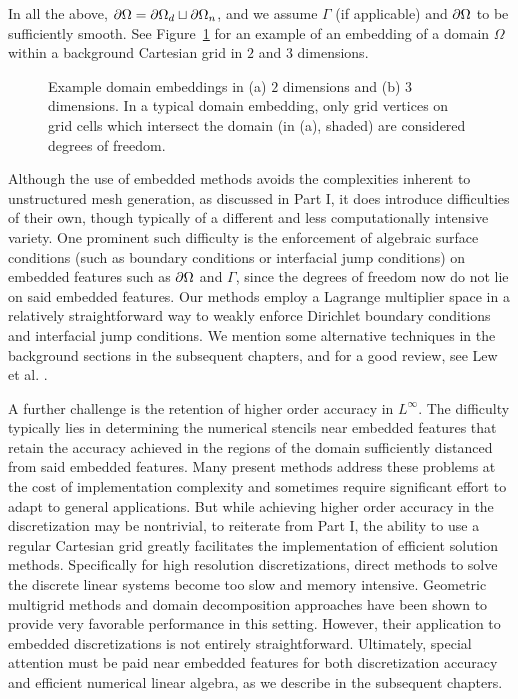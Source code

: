 In all the above, $\partial\Omega = \partial\Omega_d \sqcup \partial\Omega_n$, and we assume $\Gamma$ (if applicable) and $\partial\Omega$ to be sufficiently smooth. See Figure~\ref{fig:pt2.embedding} for an example of an embedding of a domain $\Omega$ within a background Cartesian grid in $2$ and $3$ dimensions.

\setlength{\figureheight}{0.40\columnwidth}
\begin{figure}[htbp]
\begin{center}
\caption{Example domain embeddings in (a) $2$ dimensions and (b) $3$ dimensions. In a typical domain embedding, only grid vertices on grid cells which intersect the domain (in (a), shaded) are considered degrees of freedom.}
\label{fig:pt2.embedding}
\end{center}
\end{figure}

Although the use of embedded methods avoids the complexities inherent to unstructured mesh generation, as discussed in Part I, it does introduce difficulties of their own, though typically of a different and less computationally intensive variety. One prominent such difficulty is the enforcement of algebraic surface conditions (such as boundary conditions or interfacial jump conditions) on embedded features such as $\partial\Omega$ and $\Gamma$, since the degrees of freedom now do not lie on said embedded features. Our methods employ a Lagrange multiplier space in a relatively straightforward way to weakly enforce Dirichlet boundary conditions and interfacial jump conditions. We mention some alternative techniques in the background sections in the subsequent chapters, and for a good review, see Lew et al. \cite{Lew.Adrian08}.

A further challenge is the retention of higher order accuracy in $L^{\infty}$. The difficulty typically lies in determining the numerical stencils near embedded features that retain the accuracy achieved in the regions of the domain sufficiently distanced from said embedded features. Many present methods address these problems at the cost of implementation complexity and sometimes require significant effort to adapt to general applications. But while achieving higher order accuracy in the discretization may be nontrivial, to reiterate from Part I, the ability to use a regular Cartesian grid greatly facilitates the implementation of efficient solution methods. Specifically for high resolution discretizations, direct methods to solve the discrete linear systems become too slow and memory intensive. Geometric multigrid methods and domain decomposition approaches have been shown to provide very favorable performance in this setting. However, their application to embedded discretizations is not entirely straightforward. Ultimately, special attention must be paid near embedded features for both discretization accuracy and efficient numerical linear algebra, as we describe in the subsequent chapters.

